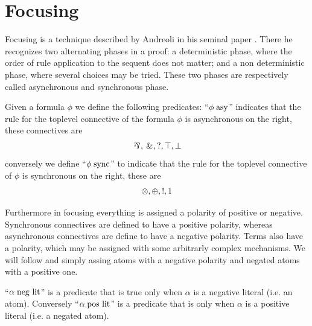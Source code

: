 \documentclass[a4paper, 12pt, english]{report}
\begin{document}
\section{Focusing}
Focusing is a technique described by Andreoli in his seminal paper \cite{Focusing}.
There he recognizes two alternating phases in a proof: a deterministic phase, where the order of rule application to the sequent does not matter; and a non deterministic phase, where several choices may be tried.
These two phases are respectively called asynchronous and synchronous phase.
\begin{define}
	Given a formula $\phi$ we define the following predicates:
	``$\phi \; \text{asy}$'' indicates that the rule for the toplevel connective of the formula $\phi$ is asynchronous on the right, these connectives are 
	$$ \llpar\!, \llwith\!, \llwn{}, \lltop, \llbot $$
	conversely we define ``$\phi \; \text{sync}$'' to indicate that the rule for the toplevel connective of $\phi$ is synchronous on the right, these are
	$$ \otimes, \oplus, !, 1 $$
\end{define}
Furthermore in focusing everything is assigned a polarity of positive or negative.
Synchronous connectives are defined to have a positive polarity, whereas asynchronous connectives are define to have a negative polarity.
Terms also have a polarity, which may be assigned with some arbitrarly complex mechanisms.
We will follow \cite{LiangMiller} and simply assing atoms with a negative polarity and negated atoms with a positive one.
\begin{define}
	``$\alpha \; \text{neg lit}$'' is a predicate that is true only when $\alpha$ is a negative literal (i.e. an atom).
	Conversely ``$\alpha \; \text{pos lit}$'' is a predicate that is only when $\alpha$ is a positive literal (i.e. a negated atom).
\end{define}
\end{document}
